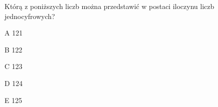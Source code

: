 \begin{tresc}
Którą z poniższych liczb można przedstawić w postaci iloczynu liczb jednocyfrowych?
\end{tresc}
\begin{wariant}{A} 121 \end{wariant}
\begin{wariant}{B} 122 \end{wariant}
\begin{wariant}{C} 123 \end{wariant}
\begin{wariant}{D} 124 \end{wariant}
\begin{wariant}{E} 125 \end{wariant}

